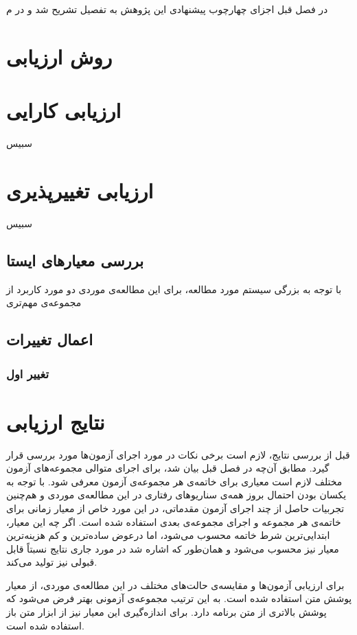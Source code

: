 در فصل قبل اجزای چهارچوب پیشنهادی این پژوهش به تفصیل تشریح شد و در م
\section{روش ارزیابی}
\section{ارزیابی کارایی}
سبیس
\section{ارزیابی تغییرپذیری}
سبیس
\subsection{بررسی معیارهای  ایستا }
با توجه به بزرگی سیستم مورد مطالعه، برای این مطالعه‌ی موردی دو مورد کاربرد از مجموعه‌ی مهم‌تری
\subsection{اعمال تغییرات}
\subsubsection{تغییر اول}

\section{نتایج ارزیابی}
قبل از بررسی نتایج، لازم است برخی نکات در مورد اجرای آزمون‌ها مورد بررسی قرار گیرد. مطابق آن‌چه در فصل قبل بیان شد، برای اجرای متوالی مجموعه‌های آزمون مختلف لازم است معیاری برای خاتمه‌ی هر مجموعه‌ی آزمون معرفی شود. با توجه به یکسان بودن احتمال بروز همه‌ی سناریوهای رفتاری در این مطالعه‌ی موردی و هم‌چنین تجربیات حاصل از چند اجرای آزمون‌ مقدماتی، در این مورد خاص از معیار زمانی برای خاتمه‌ی هر مجموعه و اجرای مجموعه‌ی بعدی استفاده شده است. اگر چه این معیار، ابتدایی‌ترین شرط خاتمه محسوب می‌شود، اما درعوض ساده‌ترین و کم هزینه‌ترین معیار نیز محسوب می‌شود و همان‌طور که اشاره شد در مورد جاری نتایج نسبتاً قابل قبولی نیز تولید می‌کند.

برای ارزیابی آزمون‌ها و مقایسه‌ی حالت‌های مختلف در این مطالعه‌ی موردی، از معیار پوشش متن  استفاده شده است. به این ترتیب مجموعه‌ی آزمونی بهتر فرض می‌شود که پوشش بالاتری از متن برنامه دارد. برای اندازه‌گیری این معیار نیز از ابزار متن باز \cite{cobertura} استفاده شده است. 


